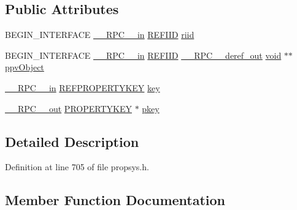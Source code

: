 \subsection*{Public Attributes}
\begin{DoxyCompactItemize}
\item 
B\+E\+G\+I\+N\+\_\+\+I\+N\+T\+E\+R\+F\+A\+CE \hyperlink{rpcsal_8h_a20b7f6da600a05c8b541659f14f7f0e6}{\+\_\+\+\_\+\+R\+P\+C\+\_\+\+\_\+in} \hyperlink{px__win__ds_8c_a80ec49c8ae61e234197d5071d2df497d}{R\+E\+F\+I\+ID} \hyperlink{struct_i_object_with_property_key_vtbl_a436f1f22d2a7e3f4847dc96f603b660a}{riid}
\item 
B\+E\+G\+I\+N\+\_\+\+I\+N\+T\+E\+R\+F\+A\+CE \hyperlink{rpcsal_8h_a20b7f6da600a05c8b541659f14f7f0e6}{\+\_\+\+\_\+\+R\+P\+C\+\_\+\+\_\+in} \hyperlink{px__win__ds_8c_a80ec49c8ae61e234197d5071d2df497d}{R\+E\+F\+I\+ID} \hyperlink{rpcsal_8h_a23bc188526f10656f9c79d950f6c3192}{\+\_\+\+\_\+\+R\+P\+C\+\_\+\+\_\+deref\+\_\+out} \hyperlink{sound_8c_ae35f5844602719cf66324f4de2a658b3}{void} $\ast$$\ast$ \hyperlink{struct_i_object_with_property_key_vtbl_ac1a0db75684c7f6c7b9a18e7fabd6dc8}{ppv\+Object}
\item 
\hyperlink{rpcsal_8h_a20b7f6da600a05c8b541659f14f7f0e6}{\+\_\+\+\_\+\+R\+P\+C\+\_\+\+\_\+in} \hyperlink{propkeydef_8h_a3e01280fe3a0b979f5a1926d5a8754af}{R\+E\+F\+P\+R\+O\+P\+E\+R\+T\+Y\+K\+EY} \hyperlink{struct_i_object_with_property_key_vtbl_aea07e93e4789c7331bf474f6c5b452cf}{key}
\item 
\hyperlink{rpcsal_8h_aa518a2c78d44d75f3685c32c455c5ed8}{\+\_\+\+\_\+\+R\+P\+C\+\_\+\+\_\+out} \hyperlink{pa__win__wasapi_8c_aa83c2fbe06e13eff5ff331ba4a302659}{P\+R\+O\+P\+E\+R\+T\+Y\+K\+EY} $\ast$ \hyperlink{struct_i_object_with_property_key_vtbl_a5aeba8bce0c15611f74a0299fca060d4}{pkey}
\end{DoxyCompactItemize}


\subsection{Detailed Description}


Definition at line 705 of file propsys.\+h.



\subsection{Member Function Documentation}
